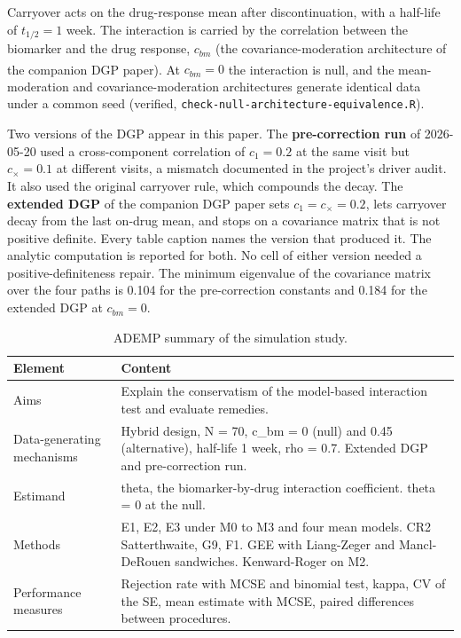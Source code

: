 \documentclass[
  11pt,
]{article}
\begin{document}
Carryover acts on the drug-response mean after discontinuation, with a
half-life of \(t_{1/2} = 1\) week. The interaction is carried by the
correlation between the biomarker and the drug response, \(c_{bm}\)
(the covariance-moderation architecture of the companion DGP paper\textsuperscript{}). At \(c_{bm} = 0\) the interaction is null, and
the mean-moderation and covariance-moderation architectures generate
identical data under a common seed (verified,
\texttt{check-null-architecture-equivalence.R}).

Two versions of the DGP appear in this paper. The \textbf{pre-correction
run} of 2026-05-20 used a cross-component correlation of
\(c_1 = 0.2\) at the same visit but \(c_\times = 0.1\) at different
visits, a mismatch documented in the project's driver audit. It also
used the original carryover rule, which compounds the decay. The
\textbf{extended DGP} of the companion DGP paper sets \(c_1 = c_\times = 0.2\),
lets carryover decay from the last on-drug mean, and stops on a
covariance matrix that is not positive definite. Every table caption
names the version that produced it. The analytic computation is
reported for both. No cell of either version needed a
positive-definiteness repair. The minimum eigenvalue of the
covariance matrix over the four paths is
0.104
for the pre-correction constants and
0.184
for the extended DGP at \(c_{bm} = 0\).

\begin{table}

\caption{\label{tab:tab-ademp}ADEMP summary of the simulation study.}
\centering
\begin{tabular}[t]{l>{\raggedright\arraybackslash}p{10cm}}
\toprule
Element & Content\\
\midrule
Aims & Explain the conservatism of the model-based interaction test and evaluate remedies.\\
Data-generating mechanisms & Hybrid design, N = 70, c\_bm = 0 (null) and 0.45 (alternative), half-life 1 week, rho = 0.7. Extended DGP and pre-correction run.\\
Estimand & theta, the biomarker-by-drug interaction coefficient. theta = 0 at the null.\\
Methods & E1, E2, E3 under M0 to M3 and four mean models. CR2 Satterthwaite, G9, F1. GEE with Liang-Zeger and Mancl-DeRouen sandwiches. Kenward-Roger on M2.\\
Performance measures & Rejection rate with MCSE and binomial test, kappa, CV of the SE, mean estimate with MCSE, paired differences between procedures.\\
\bottomrule
\end{tabular}
\end{table}
\end{document}
